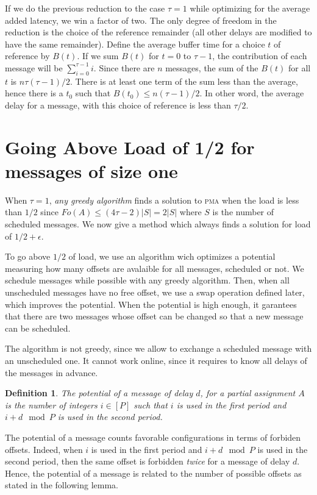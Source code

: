 \documentclass[10pt, conference, letterpaper]{IEEEtran}
\newtheorem{definition}{Definition}
\newcommand\pma{\textsc{pma}\xspace}
\begin{document}
If we do the previous reduction to the case $\tau=1$ while optimizing for the average added latency, we win a factor of two. The only degree of freedom in the reduction is the choice of the reference remainder (all other delays are modified to have the same remainder).
Define the average buffer time for a choice $t$ of reference by $B(t)$. 
If we sum $B(t)$ for $t=0$ to $\tau-1$, the contribution of each message 
will be $\sum_{i=0}^{\tau-1} i$. Since there are $n$ messages, the sum of the $B(t)$ for all $t$ is $n \tau (\tau-1)/2$. There is at least one term of the sum less than the average,
hence there is a $t_0$ such that $B(t_0) \leq n (\tau-1)/2$. In other word, the average
delay for a message, with this choice of reference is less than $\tau/2$.


\section{Going Above Load of 1/2 for messages of size one}

When $\tau = 1$, \emph{any greedy algorithm} finds a solution to \pma when the load is less than $1/2$ since $Fo(A) \leq (4\tau -2)|S| = 2|S|$ where $S$ is the number of scheduled messages. We now give a method which always finds a solution for load of $1/2 + \epsilon$.

To go above $1/2$ of load, we use an algorithm wich optimizes a potential measuring how many offsets are avalaible for all messages, scheduled or not. We schedule messages while possible with any greedy algorithm.
Then, when all unscheduled messages have no free offset, we use a swap operation defined later, which improves the potential. When the potential is high enough, it garantees that there are two messages whose offset can be changed so that a new message can be scheduled. 

 The algorithm is not greedy, since we allow to exchange a scheduled message with an unscheduled one. It cannot work online, since it requires to know all delays of the messages in advance. 

\begin{definition}
The potential of a message of delay $d$, for a partial assignment $A$
is the number of integers $i \in [P]$ such that $i$ is used in the first period and $i+d \mod P$ is used in the second period.
\end{definition}

The potential of a message counts favorable configurations in terms of forbiden offsets.
Indeed, when $i$ is used in the first period and $i+d \mod P$ is used in the second period,
then the same offset is forbidden \emph{twice} for a message of delay $d$. Hence, the potential of a message is related to the number of possible offsets as stated in the following lemma. 
\end{document}

